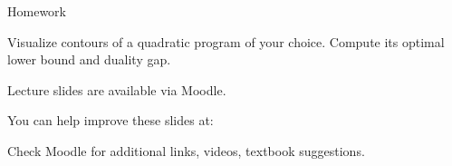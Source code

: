 \documentclass{beamer}
\begin{document}
\begin{frame}{Homework}
\begin{flushleft}

Visualize contours of a quadratic program of your choice. Compute its optimal lower bound and duality gap.

\end{flushleft}
\end{frame}





\begin{frame}
	\centerline{Lecture slides are available via Moodle.}
	\bigskip
	\centerline{You can help improve these slides at:}
	\centerline{
		\mygit
	}
	\bigskip
	
	\textcolor{black}{}
	\bigskip
	
	
	\centerline{Check Moodle for additional links, videos, textbook suggestions.}
\end{frame}
\end{document}
